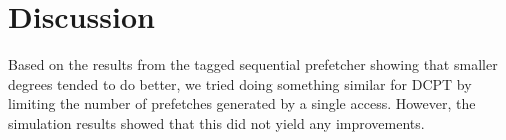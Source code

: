 \section{Discussion}

Based on the results from the tagged sequential prefetcher showing that
smaller degrees tended to do better, we tried doing something similar for
DCPT by limiting the number of prefetches generated by a single access.
However, the simulation results showed that this did not yield any
improvements.
